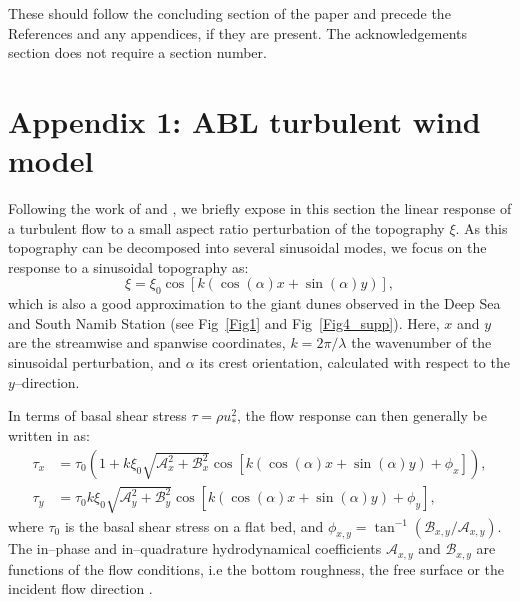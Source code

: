 \begin{acknowledgements}
These should follow the concluding section of the paper and precede the References and any appendices, if they are present. The acknowledgements section does not require a section number.
\end{acknowledgements}

\section*{Appendix 1: ABL turbulent wind model}
\label{turbulent_wind_model}

Following the work of \citet{Fourriere2010} and \citet{Andreotti2012}, we briefly expose in this section the linear response of a turbulent flow to a small aspect ratio perturbation of the topography $\xi$. As this topography can be decomposed into several sinusoidal modes, we focus on the response to a sinusoidal topography as:
\begin{equation}
  \xi = \xi_{0}\cos\left[k\left(\cos(\alpha)x + \sin(\alpha)y\right)\right],
\end{equation}
which is also a good approximation to the giant dunes observed in the Deep Sea and South Namib Station (see Fig~\ref{Fig1} and Fig~\ref{Fig4_supp}). Here, $x$ and $y$ are the streamwise and spanwise coordinates, $k=2\pi/\lambda$ the wavenumber of the sinusoidal perturbation, and $\alpha$ its crest orientation, calculated with respect to the $y$--direction.

In terms of basal shear stress $\tau = \rho u_{*}^{2}$, the flow response can then generally be written in as:
\begin{align}
  \tau_{x} & = \tau_{0}\left(1 + k\xi_{0}\sqrt{\mathcal{A}_{x}^{2} + \mathcal{B}_{x}^{2}}\cos\left[k\left(\cos(\alpha)x + \sin(\alpha)y\right) + \phi_{x}\right]\right), \\
  \tau_{y} & = \tau_{0}k\xi_{0}\sqrt{\mathcal{A}_{y}^{2} + \mathcal{B}_{y}^{2}}\cos\left[k\left(\cos(\alpha)x + \sin(\alpha)y\right) + \phi_{y}\right],
\end{align}
where $\tau_{0}$ is the basal shear stress on a flat bed, and $\phi_{x, y} = \tan^{-1}\left(\mathcal{B}_{x, y}/\mathcal{A}_{x, y}\right)$. The in--phase and in--quadrature hydrodynamical coefficients $\mathcal{A}_{x, y}$ and $\mathcal{B}_{x, y}$ are functions of the flow conditions, i.e the bottom roughness, the free surface or the incident flow direction \citep{Fourriere2010, andreotti2009, Andreotti2012, Charru2013}.

